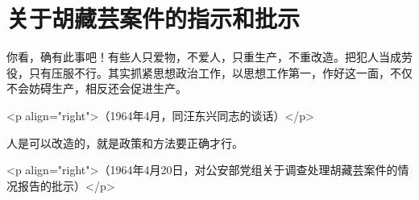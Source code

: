 \section[关于胡藏芸案件的指示和批示（一九六四年四月）]{关于胡藏芸案件的指示和批示}


你看，确有此事吧！有些人只爱物，不爱人，只重生产，不重改造。把犯人当成劳役，只有压服不行。其实抓紧思想政治工作，以思想工作第一，作好这一面，不仅不会妨碍生产，相反还会促进生产。

<p align="right">（1964年4月，同汪东兴同志的谈话）</p>

人是可以改造的，就是政策和方法要正确才行。

<p align="right">（1964年4月20日，对公安部党组关于调查处理胡藏芸案件的情况报告的批示）</p>


